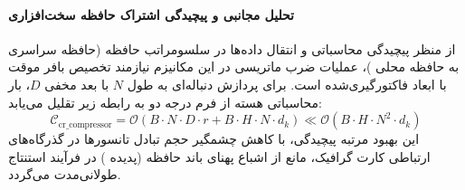 \paragraph{تحلیل مجانبی و پیچیدگی اشتراک حافظه سخت‌افزاری}
از منظر پیچیدگی محاسباتی و انتقال داده‌ها در سلسومراتب حافظه (حافظه سراسری  به حافظه محلی )، عملیات ضرب ماتریسی در این مکانیزم نیازمند تخصیص بافر موقت با ابعاد فاکتورگیری‌شده است. برای پردازش دنباله‌ای به طول $N$ با بعد مخفی $D$، بار محاسباتی هسته از فرم درجه دو به رابطه زیر تقلیل می‌یابد:
\begin{equation}
\label{eq:complexity_cr_compressor}
\mathcal{C}_{\text{cr\_compressor}} = \mathcal{O}\left( B \cdot N \cdot D \cdot r + B \cdot H \cdot N \cdot d_k \right) \ll \mathcal{O}\left( B \cdot H \cdot N^2 \cdot d_k \right)
\end{equation}
این بهبود مرتبه پیچیدگی، با کاهش چشمگیر حجم تبادل تانسورها در گذرگاه‌های ارتباطی کارت گرافیک، مانع از اشباع پهنای باند حافظه (پدیده ) در فرآیند استنتاج طولانی‌مدت می‌گردد.

